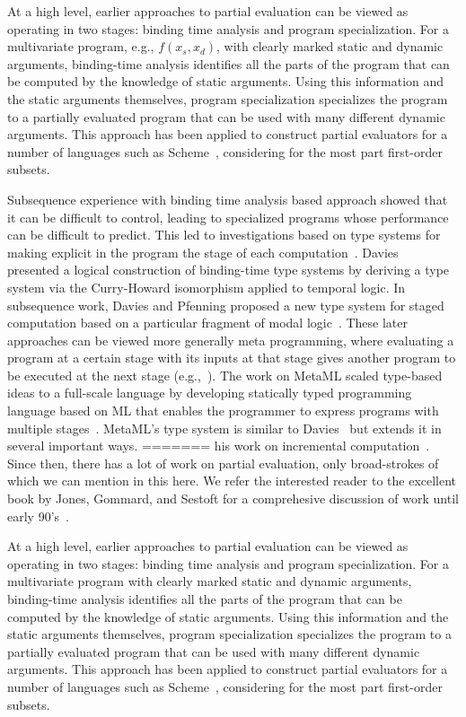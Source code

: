 At a high level, earlier approaches to partial evaluation can be
viewed as operating in two stages: binding time analysis and program
specialization.  For a multivariate program, e.g., $f(x_s,x_d)$, with
clearly marked static and dynamic arguments, binding-time analysis
identifies all the parts of the program that can be computed by the
knowledge of static arguments. Using this information and the static
arguments themselves, program specialization specializes the program
to a partially evaluated program that can be used with many different
dynamic arguments.  This approach has been applied to construct
partial evaluators for a number of languages such as 
Scheme~\cite{OB91-Similix,Consel88-Schism}, considering for the most
part first-order subsets.

Subsequence experience with binding time analysis based approach
showed that it can be difficult to control, leading to specialized
programs whose performance can be difficult to predict. This led to
investigations based on type systems for making explicit in the
program the stage of each
computation~\cite{GJ91-lambda,NN92-twolevel}.  Davies~\cite{Davies96}
presented a logical construction of binding-time type systems by
deriving a type system via the Curry-Howard isomorphism applied to
temporal logic.  In subsequence work, Davies and Pfenning proposed a
new type system for staged computation based on a particular fragment
of modal logic~\cite{DP01-modal}.  These later approaches can be
viewed more generally meta programming, where evaluating a program at
a certain stage with its inputs at that stage gives another program to
be executed at the next stage (e.g.,~\cite{JS86-staging}). The work on
MetaML scaled type-based ideas to a full-scale language by developing
statically typed programming language based on ML that enables the
programmer to express programs with multiple
stages~\cite{Taha97,taha-thesis-99}.  MetaML's type system is similar
to Davies~\cite{Davies96} but extends it in several important ways.
=======
his work on incremental computation~\cite{Lombardi67}.  Since then,
there has a lot of work on partial evaluation, only broad-strokes of
which we can mention in this here.  We refer the interested reader to
the excellent book by Jones, Gommard, and Sestoft for a comprehesive
discussion of work until early 90's~\cite{JGS93}.

At a high level, earlier approaches to partial evaluation can be
viewed as operating in two stages: binding time analysis and program
specialization.  For a multivariate program with clearly marked static
and dynamic arguments, binding-time analysis identifies all the parts
of the program that can be computed by the knowledge of static
arguments. Using this information and the static arguments themselves,
program specialization specializes the program to a partially
evaluated program that can be used with many different dynamic
arguments.  This approach has been applied to construct partial
evaluators for a number of languages such as
Scheme~\cite{OB91-Similix,Consel88-Schism}, considering for the most
part first-order subsets.

